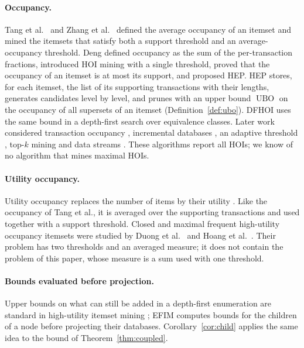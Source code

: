 \documentclass[pdflatex,sn-mathphys,Numbered]{sn-jnl}
\theoremstyle{thmstyleone}
\theoremstyle{thmstyletwo}
\theoremstyle{thmstylethree}
\newcommand{\ubo}{\operatorname{UBO}}
\begin{document}
\paragraph{Occupancy.}
Tang et al.\ \cite{tang2012occupancy} and Zhang et al.\ \cite{zhang2015occupancy} defined the average occupancy of an itemset and mined the itemsets that satisfy both a support threshold and an average-occupancy threshold. Deng \cite{deng2020hoi} defined occupancy as the sum of the per-transaction fractions, introduced HOI mining with a single threshold, proved that the occupancy of an itemset is at most its support, and proposed HEP. HEP stores, for each itemset, the list of its supporting transactions with their lengths, generates candidates level by level, and prunes with an upper bound $\ubo$ on the occupancy of all supersets of an itemset (Definition~\ref{def:ubo}). DFHOI \cite{nguyen2023dfhoi} uses the same bound in a depth-first search over equivalence classes. Later work considered transaction occupancy \cite{datta2022hoimto}, incremental databases \cite{kim2022incremental}, an adaptive threshold \cite{tran2025namhep}, top-$k$ mining \cite{yildirim2025topk,ngo2026topk} and data streams \cite{cho2026damped}. These algorithms report all HOIs; we know of no algorithm that mines maximal HOIs.

\paragraph{Utility occupancy.}
Utility occupancy replaces the number of items by their utility \cite{shen2016ocean,gan2020huopm}. Like the occupancy of Tang et al., it is averaged over the supporting transactions and used together with a support threshold. Closed and maximal frequent high-utility occupancy itemsets were studied by Duong et al.\ \cite{duong2024concise} and Hoang et al.\ \cite{hoang2025maxfhuoi}. Their problem has two thresholds and an averaged measure; it does not contain the problem of this paper, whose measure is a sum used with one threshold.

\paragraph{Bounds evaluated before projection.}
Upper bounds on what can still be added in a depth-first enumeration are standard in high-utility itemset mining \cite{liu2012huiminer,zida2017efim,gan2021survey}; EFIM \cite{zida2017efim} computes bounds for the children of a node before projecting their databases. Corollary~\ref{cor:child} applies the same idea to the bound of Theorem~\ref{thm:coupled}.
\end{document}
